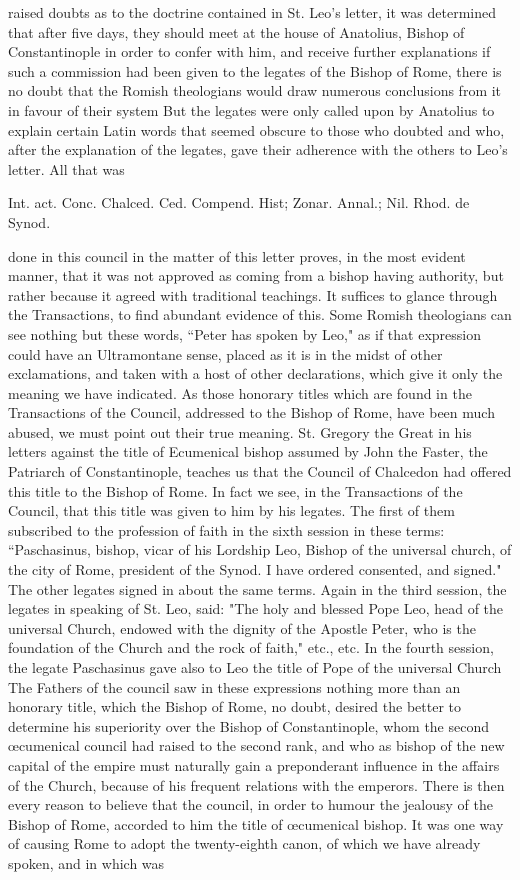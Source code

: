 raised doubts as to the doctrine contained in St. Leo’s letter, it was determined that after five days, they should meet at the house of Anatolius, Bishop of Constantinople in order to confer with him, and receive further explanations if such a commission had been given to the legates of the Bishop of Rome, there is no doubt that the Romish theologians would draw numerous conclusions from it in favour of their system But the legates were only called upon by Anatolius to explain certain Latin words that seemed obscure to those who doubted and who, after the explanation of the legates, gave their adherence with the others to Leo's letter. All that was

Int. act. Conc. Chalced. Ced. Compend. Hist; Zonar. Annal.; Nil. Rhod. de Synod.

done in this council in the matter of this letter proves, in the most evident manner, that it was not approved as coming from a bishop having authority, but rather because it agreed with traditional teachings. It suffices to glance through the Transactions, to find abundant evidence of this. Some Romish theologians can see nothing but these words, “Peter has spoken by Leo," as if that expression could have an Ultramontane sense, placed as it is in the midst of other exclamations, and taken with a host of other declarations, which give it only the meaning we have indicated. As those honorary titles which are found in the Transactions of the Council, addressed to the Bishop of Rome, have been much abused, we must point out their true meaning. St. Gregory the Great in his letters against the title of Ecumenical bishop assumed by John the Faster, the Patriarch of Constantinople, teaches us that the Council of Chalcedon had offered this title to the Bishop of Rome. In fact we see, in the Transactions of the Council, that this title was given to him by his legates. The first of them subscribed to the profession of faith in the sixth session in these terms: “Paschasinus, bishop, vicar of his Lordship Leo, Bishop of the universal church, of the city of Rome, president of the Synod. I have ordered consented, and signed." The other legates signed in about the same terms. Again in the third session, the legates in speaking of St. Leo, said: "The holy and blessed Pope Leo, head of the universal Church, endowed with the dignity of the Apostle Peter, who is the foundation of the Church and the rock of faith," etc., etc. In the fourth session, the legate Paschasinus gave also to Leo the title of Pope of the universal Church The Fathers of the council saw in these expressions nothing more than an honorary title, which the Bishop of Rome, no doubt, desired the better to determine his superiority over the Bishop of Constantinople, whom the second œcumenical council had raised to the second rank, and who as bishop of the new capital of the empire must naturally gain a preponderant influence in the affairs of the Church, because of his frequent relations with the emperors. There is then every reason to believe that the council, in order to humour the jealousy of the Bishop of Rome, accorded to him the title of œcumenical bishop. It was one way of causing Rome to adopt the twenty-eighth canon, of which we have already spoken, and in which was 